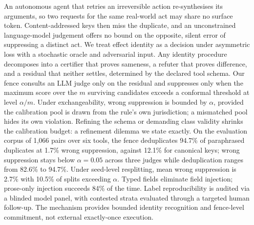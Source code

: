An autonomous agent that retries an irreversible action re-synthesises its arguments, so two requests for the same real-world act may share no surface token. Content-addressed keys then miss the duplicate, and an unconstrained language-model judgement offers no bound on the opposite, silent error of suppressing a distinct act. We treat effect identity as a decision under asymmetric loss with a stochastic oracle and adversarial input. Any identity procedure decomposes into a certifier that proves sameness, a refuter that proves difference, and a residual that neither settles, determined by the declared tool schema. Our fence consults an LLM judge only on the residual and suppresses only when the maximum score over the $m$ surviving candidates exceeds a conformal threshold at level $\alpha/m$. Under exchangeability, wrong suppression is bounded by $\alpha$, provided the calibration pool is drawn from the rule's own jurisdiction; a mismatched pool hides its own violation. Refining the schema or demanding class validity shrinks the calibration budget: a refinement dilemma we state exactly. On the evaluation corpus of 1,066 pairs over six tools, the fence deduplicates 94.7\% of paraphrased duplicates at 1.7\% wrong suppression, against 12.1\% for canonical keys; wrong suppression stays below $\alpha=0.05$ across three judges while deduplication ranges from 82.6\% to 94.7\%. Under seed-level resplitting, mean wrong suppression is 2.7\% with 10.5\% of splits exceeding $\alpha$. Typed fields eliminate field injection; prose-only injection succeeds 84\% of the time. Label reproducibility is audited via a blinded model panel, with contested strata evaluated through a targeted human follow-up. The mechanism provides bounded identity recognition and fence-level commitment, not external exactly-once execution.
